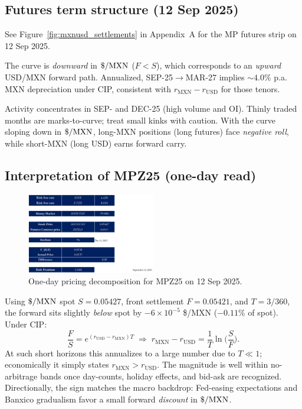 \documentclass[11pt,a4paper]{article} %
\begin{document}
\subsection{Futures term structure (12 Sep 2025)}

See Figure~\ref{fig:mxnusd_settlements} in Appendix~A for the MP futures strip on 12 Sep 2025.

The curve is \emph{downward} in \(\$/{\rm MXN}\) (\(F<S\)), which corresponds to an \emph{upward} USD/MXN forward path. Annualized, SEP-25\(\to\)MAR-27 implies \(\sim 4.0\%\) p.a. MXN depreciation under CIP, consistent with \(r_{\mathrm{MXN}}-r_{\mathrm{USD}}\) for those tenors.

Activity concentrates in SEP- and DEC-25 (high volume and OI). Thinly traded months are marks-to-curve; treat small kinks with caution. With the curve sloping down in \(\$/{\rm MXN}\), long-MXN positions (long futures) face \emph{negative roll}, while short-MXN (long USD) earns forward carry.

\subsection{Interpretation of \texorpdfstring{MPZ25}{MPZ25} (one-day read)}

\begin{figure}[h]
  \centering
  \includegraphics[width=0.5\textwidth]{figures/usdmxn.png}
\caption{One-day pricing decomposition for MPZ25 on 12 Sep 2025.}
\end{figure}

Using \(\$/{\rm MXN}\) spot \(S=0.05427\), front settlement \(F=0.05421\), and \(T=3/360\), the forward sits slightly \emph{below} spot by \(-6\times 10^{-5}\) \$/MXN (\(-0.11\%\) of spot). Under CIP:
\[
\frac{F}{S}=e^{(r_{\mathrm{USD}}-r_{\mathrm{MXN}})T}\;\Rightarrow\;
r_{\mathrm{MXN}}-r_{\mathrm{USD}}=\frac{1}{T}\ln\!\Big(\frac{S}{F}\Big).
\]
At such short horizons this annualizes to a large number due to \(T\ll 1\); economically it simply states \(r_{\mathrm{MXN}}>r_{\mathrm{USD}}\). The magnitude is well within no-arbitrage bands once day-counts, holiday effects, and bid-ask are recognized. Directionally, the sign matches the macro backdrop: Fed-easing expectations and Banxico gradualism favor a small forward \emph{discount} in \(\$/{\rm MXN}\).
\end{document}

